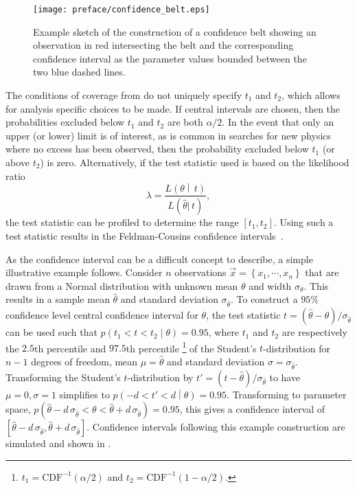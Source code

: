 \begin{figure}[htbp]
 \centering
 \texttt{[image: preface/confidence\_belt.eps]}
 \caption[Neyman construction of a confidence interval using a confidence belt.]{%
  Example sketch of the construction of a confidence belt showing an observation in red intersecting the belt and the corresponding confidence interval as the parameter values bounded between the two blue dashed lines.}\label{fig:confidence_belt}
\end{figure}

The conditions of coverage from  do not uniquely specify $t_{1}$ and $t_{2}$, which allows for analysis specific choices to be made.
If central intervals are chosen, then the probabilities excluded below $t_{1}$ and $t_{2}$ are both $\alpha/2$.
In the event that only an upper (or lower) limit is of interest, as is common in searches for new physics where no excess has been observed, then the probability excluded below $t_{1}$ (or above $t_{2}$) is zero.
Alternatively, if the test statistic used is based on the likelihood ratio
\[
 \lambda = \frac{L\left(\theta\middle|\, t\right)}{L(\hat{\theta}|\, t)},
\]
the test statistic can be profiled to determine the range $\left[t_{1}, t_{2}\right]$.
Using such a test statistic results in the Feldman-Cousins confidence intervals~\cite{Feldman:1997qc}.

As the confidence interval can be a difficult concept to describe, a simple illustrative example follows.
Consider $n$ observations $\vec{x} = \left\{x_{1}, \cdots, x_{n}\right\}$ that are drawn from a Normal distribution with unknown mean $\theta$ and width $\sigma_{\theta}$.
This results in a sample mean $\hat{\theta}$ and standard deviation $\sigma_{\hat{\theta}}$.
To construct a $95\%$ confidence level central confidence interval for $\theta$, the test statistic $t = \left(\hat{\theta} - \theta\right)/\sigma_{\hat{\theta}}$ can be used such that ${p\left(t_{1} < t < t_{2}\middle|\theta\right) = 0.95}$, where $t_{1}$ and $t_{2}$ are respectively the $2.5$th percentile and $97.5$th percentile%
\footnote{$t_{1} = \mathrm{CDF}^{-1}\left(\alpha/2\right)$ and $t_{2} = \mathrm{CDF}^{-1}\left(1 - \alpha/2\right)$.}
of the Student's $t$-distribution for $n-1$ degrees of freedom, mean $\mu=\hat{\theta}$ and standard deviation $\sigma=\sigma_{\hat{\theta}}$.
Transforming the Student's $t$-distribution by $t' = \left(t-\hat{\theta}\right)/\sigma_{\hat{\theta}}$ to have $\mu=0, \sigma=1$ simplifies to ${p\left(-d < t' < d\middle|\theta\right) = 0.95}$.
Transforming to parameter space, ${p\left(\hat{\theta} - d\, \sigma_{\hat{\theta}} < \theta < \hat{\theta} + d\, \sigma_{\hat{\theta}}\right)  = 0.95}$, this gives a confidence interval of $\left[\hat{\theta} - d\, \sigma_{\hat{\theta}}, \hat{\theta} + d\, \sigma_{\hat{\theta}}\right]$.
Confidence intervals following this example construction are simulated and shown in .

